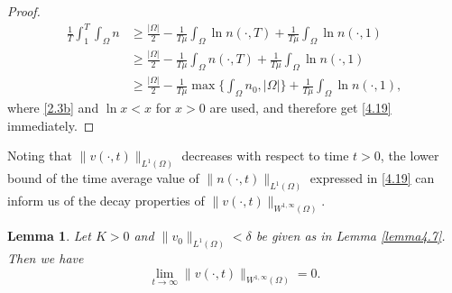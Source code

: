 \documentclass[12pt]{article}
\theoremstyle{plain}
\newtheorem{lemma}{Lemma}[section]
\theoremstyle{definition}
\numberwithin{equation}{section}
\begin{document}
\begin{proof}[Proof]
\begin{equation}
\begin{split}
\frac 1T \int^{T}_1\int_\Omega n
&\geq  \frac { |\Omega|} 2-\frac 1{T\mu}\int_\Omega \ln n(\cdot,T)  +\frac 1{T\mu} \int_\Omega \ln n(\cdot,1)\\
& \geq
\frac  { |\Omega|} 2-\frac 1{T\mu}\int_\Omega n (\cdot,T) +\frac 1{T\mu} \int_\Omega \ln n(\cdot,1)\\
& \geq
\frac  { |\Omega|} 2-\frac 1{T\mu}\max\{\int_\Omega  n_0,|\Omega|\}  +\frac 1{T\mu} \int_\Omega \ln n(\cdot,1),
\end{split}
\end{equation}
where  \eqref{2.3b} and $\ln x<x$ for $x>0$ are used, and therefore get \eqref{4.19} immediately.
\end{proof}

Noting that $\|v(\cdot,t)\|_{L^1(\Omega)}$  decreases with respect to time $t>0$,
the lower bound of the time average value of $\|n(\cdot,t)\|_{L^1(\Omega)}$ expressed in \eqref{4.19} can inform us of
the decay properties of $\|v(\cdot,t)\|_{W^{1,\infty}(\Omega)}$.
\begin{lemma}\label{lemma4.8}
 Let $K>0$ and $\|v_0\|_{L^1(\Omega)}<\delta$ be given as in Lemma \ref{lemma4.7}. Then we have
 \begin{equation}\label{4.24}
\displaystyle\lim_{t\rightarrow \infty} \|v(\cdot,t)\|_{W^{1,\infty}(\Omega)} =0.
\end{equation}
\end{lemma}
\end{document}
